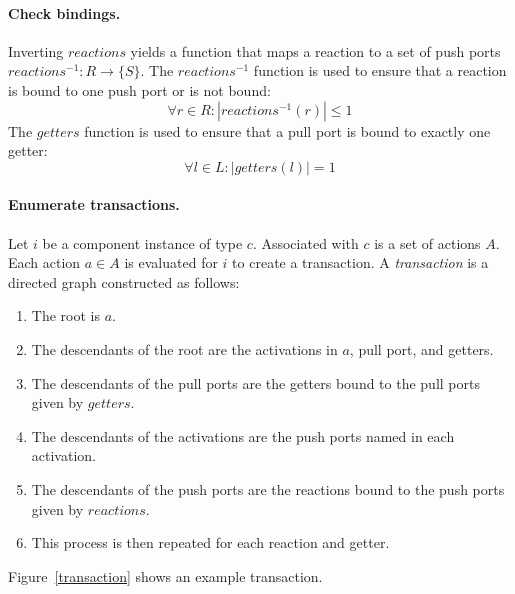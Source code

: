 \paragraph{Check bindings.}
Inverting $reactions$ yields a function that maps a reaction to a set of push ports $reactions^{-1}: R \to \{ S \}$.
The $reactions^{-1}$ function is used to ensure that a reaction is bound to one push port or is not bound:
\begin{displaymath}
\forall r \in R : |reactions^{-1} (r)| \leq 1
\end{displaymath}
The $getters$ function is used to ensure that a pull port is bound to exactly one getter:
\begin{displaymath}
\forall l \in L : |getters (l)| = 1
\end{displaymath}

\paragraph{Enumerate transactions.}
Let $i$ be a component instance of type $c$.
Associated with $c$ is a set of actions $A$.
Each action $a \in A$ is evaluated for $i$ to create a transaction.
A \emph{transaction} is a directed graph constructed as follows:
\begin{enumerate}
\item The root is $a$.
\item The descendants of the root are the activations in $a$, pull port, and getters.
\item The descendants of the pull ports are the getters bound to the pull ports given by $getters$.
\item The descendants of the activations are the push ports named in each activation.
\item The descendants of the push ports are the reactions bound to the push ports given by $reactions$.
\item This process is then repeated for each reaction and getter.
\end{enumerate}
Figure~\ref{transaction} shows an example transaction.


